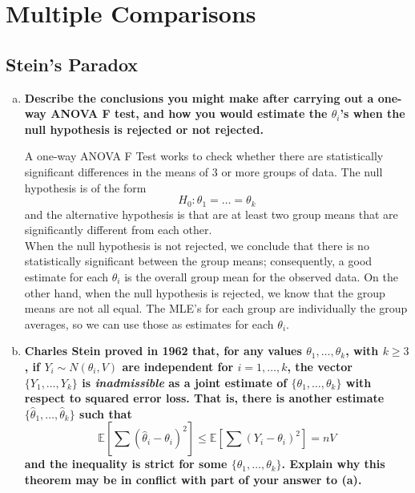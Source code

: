 \newpage

\setcounter{section}{7}
\section{Multiple Comparisons}

\setcounter{subsection}{2}
\subsection{Stein's Paradox}
\graphicspath{{notes/img}}

\begin{enumerate}[a)]
    \item \textbf{Describe the conclusions you might make after carrying out a one-way ANOVA F test,
    and how you would estimate the $\theta_i$'s when the null hypothesis is rejected or not rejected.}

    A one-way ANOVA F Test works to check whether there are statistically significant differences in the means of 3 or more groups of data. The null hypothesis is of the form
    \[
        H_0\colon \theta_1 = \dots = \theta_k
    \]
    and the alternative hypothesis is that are at least two group means that are significantly different from each other. \\

    When the null hypothesis is not rejected, we conclude that there is no statistically significant between the group means; consequently, a good estimate for each $\theta_i$ is the overall group mean for the observed data.
    On the other hand, when the null hypothesis is rejected, we know that the group means are not all equal. The MLE's for each group are individually the group averages, so we can use those as estimates for each $\theta_i$. \\

    \item \textbf{Charles Stein proved in 1962 that, for any values $\theta_1, \dots, \theta_k$, with $k \geq 3$, if $Y_i \sim N(\theta_i, V)$ are independent for $i = 1, \dots, k$, the
    vector $\{ Y_1, \dots, Y_k \}$ is \textit{inadmissible} as a joint estimate of $\{ \theta_1, \dots, \theta_k \}$ with respect to squared error loss. 
    That is, there is another estimate $\{ \hat{\theta}_1, \dots, \hat{\theta}_k \}$ such that}
    \[
        \mathbb{E}\left[ \sum (\hat{\theta}_i - \theta_i)^2 \right] \leq \mathbb{E}\left[ \sum (Y_i - \theta_i)^2 \right] = nV
    \]
    \textbf{and the inequality is strict for some $\{ \theta_1, \dots, \theta_k \}$. Explain why this theorem may be in conflict with part of your answer to (a).} \\


\end{enumerate}
